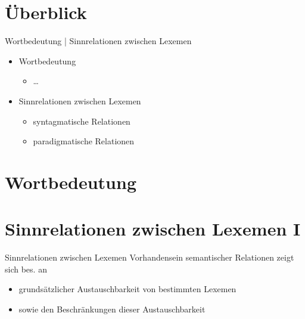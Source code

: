 \section{Überblick}

\begin{frame}{Wortbedeutung | Sinnrelationen zwischen Lexemen}
\onslide<+->
\begin{itemize}[<+->]
	\item		Wortbedeutung
	\begin{itemize}[<+->]
		\item		\ldots
	\end{itemize}
\Zeile
	\item 	Sinnrelationen zwischen Lexemen
	\begin{itemize}[<+->]
		\item 	syntagmatische Relationen
		\item		paradigmatische Relationen
	\end{itemize}
\end{itemize}
\end{frame}

\section{Wortbedeutung}

\section[Sinnrelationen I]{Sinnrelationen zwischen Lexemen I}

\begin{frame}{Sinnrelationen zwischen Lexemen}
\onslide<+->
Vorhandensein semantischer Relationen zeigt sich bes. an
\begin{itemize}[<+->]
	\item	grundsätzlicher Austauschbarkeit von bestimmten Lexemen
	\item	sowie den Beschränkungen dieser Austauschbarkeit
\end{itemize}
\onslide<+->
\Zeile
\begin{exe}
	\onslide<+->
	\onslide<+->
\end{exe}
\end{frame}

